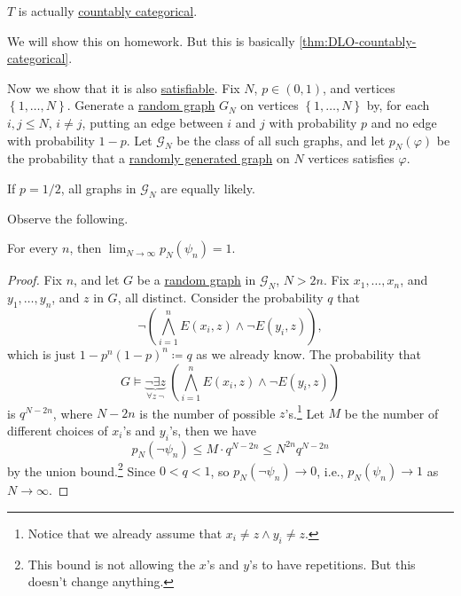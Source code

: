 \begin{remark}
	\(T\) is actually \hyperref[def:countably-categorical]{countably categorical}.
\end{remark}
\begin{explanation}
	We will show this on homework. But this is basically \autoref{thm:DLO-countably-categorical}.
\end{explanation}

Now we show that it is also \hyperref[def:satisfiable]{satisfiable}. Fix \(N\), \(p\in (0, 1)\), and vertices \(\left\{ 1, \dots , N \right\} \). Generate a \hyperref[def:random-graph]{random graph} \(G_N\) on vertices \(\left\{ 1, \dots , N \right\} \) by, for each \(i, j \leq N\), \(i \neq j\), putting an edge between \(i\) and \(j\) with probability \(p\) and no edge with probability \(1 - p\). Let \(\mathcal{G} _N\) be the class of all such graphs, and let \(p_N(\varphi )\) be the probability that a \hyperref[def:random-graph]{randomly generated graph} on \(N\) vertices satisfies \(\varphi \).

\begin{eg}
	If \(p = 1 / 2\), all graphs in \(\mathcal{G} _N\) are equally likely.
\end{eg}

Observe the following.

\begin{proposition}\label{prop:random-graph-almost-surely-satisfiable}
	For every \(n\), then \(\lim_{N \to \infty} p_N(\psi _n) = 1\).
\end{proposition}
\begin{proof}
	Fix \(n\), and let \(G\) be a \hyperref[def:random-graph]{random graph} in \(\mathcal{G} _N\), \(N > 2n\). Fix \(x_1, \dots , x_n\), and \(y_1, \dots , y_n\), and \(z\) in \(G\), all distinct. Consider the probability \(q\) that
	\[
		\lnot \left( \bigwedge_{i=1}^{n} E(x_i, z) \land \lnot E(y_i, z)\right),
	\]
	which is just \(1 - p^n (1-p)^n \coloneqq q\) as we already know. The probability that
	\[
		G \models \underbrace{\lnot \exists z}_{\forall z\ \lnot }\ \left( \bigwedge_{i=1}^{n} E(x_i, z) \land \lnot E(y_i, z) \right)
	\]
	is \(q^{N-2n}\), where \(N-2n\) is the number of possible \(z\)'s.\footnote{Notice that we already assume that \( x_i \neq z \land y_i \neq z\).} Let \(M\) be the number of different choices of \(x_i\)'s and \(y_i\)'s, then we have
	\[
		p_N(\lnot \psi _n)
		\leq M\cdot q^{N - 2n}
		\leq N^{2n} q^{N-2n}
	\]
	by the union bound.\footnote{This bound is not allowing the \(x\)'s and \(y\)'s to have repetitions. But this doesn't change anything.} Since \(0 < q < 1\), so \(p_N (\lnot \psi _n) \to 0\), i.e., \(p_N(\psi _n) \to 1\) as \(N \to \infty \).
\end{proof}


